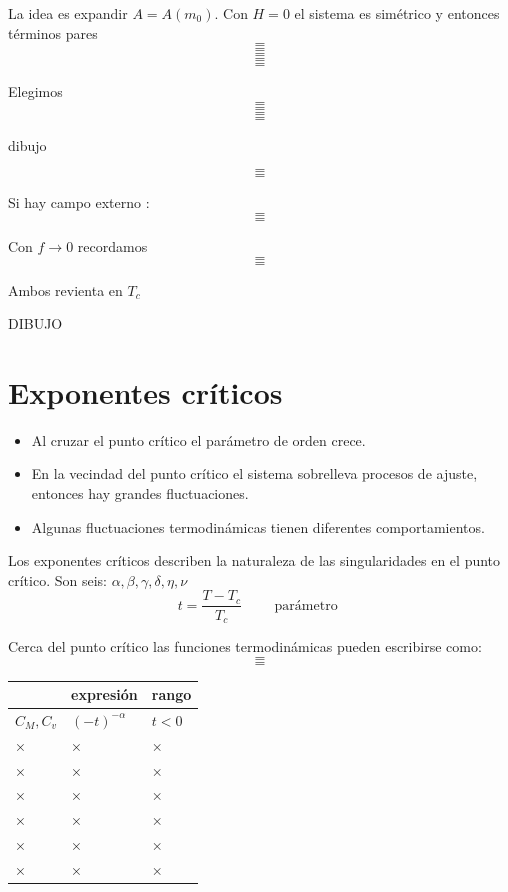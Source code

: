 \documentclass[10pt,oneside]{CBFT_book}
\begin{document}
La idea es expandir $ A = A(m_0) $.
Con $H=0$ el sistema es simétrico y entonces términos pares
\[=\]
\[=\]
\[=\]
\[=\]
\[=\]

Elegimos
\[=\]
\[=\]
\[=\]
\[=\]

dibujo

\[=\]
\[=\]

Si hay campo externo :
\[=\]
\[=\]

Con $f \to 0$ recordamos
\[=\]
\[=\]

Ambos revienta en $T_c$

DIBUJO

\section{Exponentes críticos}

\begin{itemize}
 \item Al cruzar el punto crítico el parámetro de orden crece.
 \item En la vecindad del punto crítico el sistema sobrelleva procesos de ajuste, entonces
 hay grandes fluctuaciones.
 \item Algunas fluctuaciones termodinámicas tienen diferentes comportamientos.
\end{itemize}

Los exponentes críticos describen la naturaleza de las singularidades en el punto crítico.
Son seis: $ \alpha, \beta, \gamma, \delta, \eta, \nu $
\[
	t = \frac{T-T_c}{T_c} \qquad \text{ parámetro } 
\]

Cerca del punto crítico las funciones termodinámicas pueden escribirse como:
\[=\]
\[=\]

\begin{center}
\begin{tabular}{lll}
 & expresión & rango \\
\hline
$C_M, C_v$ & $(-t)^{-\alpha}$ & $t < 0$  \\
× & × & ×\\
× & × & ×\\
× & × & ×\\
× & × & ×\\
× & × & ×\\
× & × & ×
\end{tabular}
\end{center}
\end{document}
